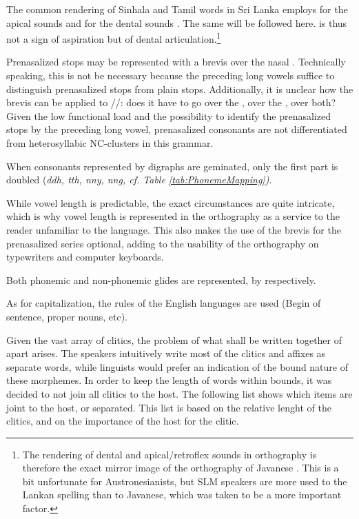 The common rendering of Sinhala and Tamil words in Sri Lanka employs  for the apical sounds  and  for the dental sounds \phonem{\dentt, \dentd}. The same will be followed here.  is thus not a sign of aspiration but of dental articulation.\footnote{The rendering of dental and apical/retroflex sounds in ortho\-graphy is therefore the exact mirror image of the orthography of Javanese \citep[10]{Robson1992}. This is a bit unfortunate for Austronesianists, but SLM speakers are more used to the Lankan spelling than to Javanese, which was taken to be  a more important factor.}

Prenasalized stops may be represented with a brevis over the nasal .  Technically speaking, this is not be necessary because the preceding long vowels suffice to distinguish prenasalized stops from plain stops. Additionally, it is unclear how the brevis can be applied to /\nG/: does it have to go over the , over the , over both? Given the low functional load and the possibility to identify the prenasalized stops by the preceding long vowel, prenasalized consonants are not differentiated from heterosyllabic NC-clusters in this grammar.

When consonants represented by digraphs are geminated, only the first part is doubled (\em ddh, tth, nny, nng\em, cf. Table \ref{tab:PhonemeMapping}).



While vowel length is predictable, the exact circumstances are quite intricate, which is why vowel length is represented in the orthography as a service to the reader unfamiliar to the language. This also makes the use of the brevis for the prenasalized series optional, adding to the usability of the orthography on typewriters and computer keyboards.

Both phonemic and non-phonemic glides are represented,  by  respectively.
 
As for capitalization, the rules of the English languages are used (Begin of sentence, proper nouns, etc).

Given the vast array of clitics, the problem of what shall be written together of apart arises. The speakers intuitively write most of the clitics and affixes as separate words, while linguists would prefer an indication of the bound nature of these morphemes. In order to keep the length of words within bounds, it was decided to not join all clitics to the host. The following list shows which items are joint to the host, or separated. This list is based on the relative lenght of the clitics, and on the importance of the host for the clitic.

